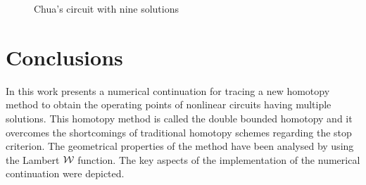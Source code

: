 \documentclass[conference]{IEEEtran}
\begin{document}
\begin{figure}[hbt]
\centerline{
\epsfxsize=90mm
}
\caption{Chua's circuit with nine solutions}
\label{chua}
\end{figure}

\section{Conclusions}
In this work presents a numerical continuation for tracing a new homotopy
method to obtain the operating points of nonlinear circuits having
multiple solutions. 
This homotopy method is called the double bounded homotopy and it overcomes the shortcomings of
traditional homotopy schemes regarding the stop criterion. The geometrical properties of the method have been
analysed by using the Lambert $\cal W$ function. The key aspects of the implementation of the numerical continuation were depicted.


 





%
\IEEEpeerreviewmaketitle





 
\end{document}
